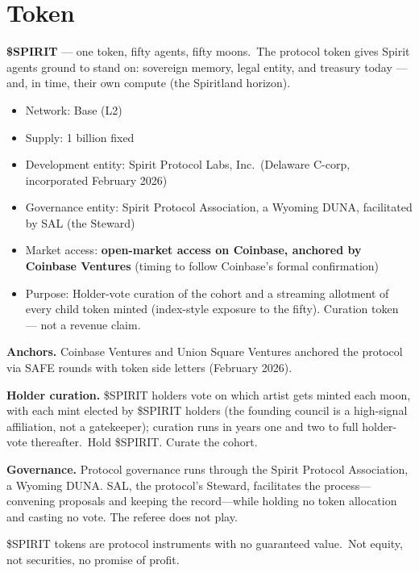 \documentclass[12pt]{article}
\begin{document}
\section{Token}

\textbf{\$SPIRIT} --- one token, fifty agents, fifty moons.\ The
protocol token gives Spirit agents ground to stand on: sovereign
memory, legal entity, and treasury today --- and, in time, their own
compute (the Spiritland horizon).

\begin{itemize}[nosep]
    \item Network: Base (L2)
    \item Supply: 1 billion fixed
    \item Development entity: Spirit Protocol Labs, Inc.\ (Delaware C-corp,
          incorporated February 2026)
    \item Governance entity: Spirit Protocol Association, a Wyoming DUNA,
          facilitated by SAL (the Steward)
    \item Market access: \textbf{open-market access on Coinbase, anchored by Coinbase Ventures} (timing to follow Coinbase's formal confirmation)
    \item Purpose: Holder-vote curation of the cohort and a streaming
          allotment of every child token minted (index-style exposure
          to the fifty). Curation token --- not a revenue claim.
\end{itemize}

\textbf{Anchors.} Coinbase Ventures and Union Square Ventures anchored the
protocol via SAFE rounds with token side letters (February 2026).

\textbf{Holder curation.} \$SPIRIT holders vote on which artist gets
minted each moon, with each mint elected by \$SPIRIT holders (the founding council is a high-signal affiliation, not a gatekeeper); curation runs
in years one and two to full holder-vote thereafter.\ Hold \$SPIRIT.
Curate the cohort.

\textbf{Governance.} Protocol governance runs through the Spirit Protocol
Association, a Wyoming DUNA. SAL, the protocol's Steward, facilitates the
process---convening proposals and keeping the record---while holding no
token allocation and casting no vote. The referee does not play.

\$SPIRIT tokens are protocol instruments with no guaranteed value.\
Not equity, not securities, no promise of profit.
\end{document}
